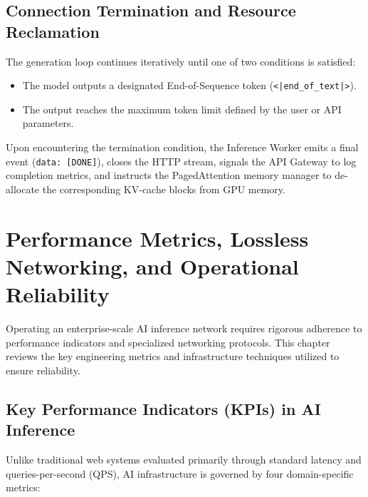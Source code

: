 \documentclass[12pt,a4paper]{report}
\begin{document}
\section{Connection Termination and Resource Reclamation}
The generation loop continues iteratively until one of two conditions is satisfied:
\begin{itemize}[leftmargin=1.2cm]
    \item The model outputs a designated End-of-Sequence token (\texttt{<|end\_of\_text|>}).
    \item The output reaches the maximum token limit defined by the user or API parameters.
\end{itemize}

Upon encountering the termination condition, the Inference Worker emits a final event (\texttt{data: [DONE]}), closes the HTTP stream, signals the API Gateway to log completion metrics, and instructs the PagedAttention memory manager to de-allocate the corresponding KV-cache blocks from GPU memory.

\chapter{Performance Metrics, Lossless Networking, and Operational Reliability}

Operating an enterprise-scale AI inference network requires rigorous adherence to performance indicators and specialized networking protocols. This chapter reviews the key engineering metrics and infrastructure techniques utilized to ensure reliability.

\section{Key Performance Indicators (KPIs) in AI Inference}
Unlike traditional web systems evaluated primarily through standard latency and queries-per-second (QPS), AI infrastructure is governed by four domain-specific metrics:
\end{document}
